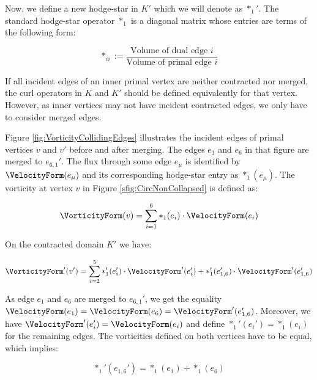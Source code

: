 Now, we define a new hodge-star in $K'$ which we will denote as $*_1'$.
The standard hodge-star operator $*_1$ is a diagonal matrix whose entries are terms of the following form:

\begin{equation}
*_{ii} := \frac{\text{Volume of dual edge $i$}}{\text{Volume of primal edge $i$}}
\end{equation}

If all incident edges of an inner primal vertex are neither contracted nor
merged, the curl operators in $K$ and $K'$ should be defined equivalently for that vertex.
However, as inner vertices may not have incident contracted edges, we only have to consider merged edges.


Figure \ref{fig:VorticityCollidingEdges} illustrates the incident edges of primal vertices $v$ and $v'$ before and after merging.%
The edges $e_1$ and $e_6$ in that figure are merged to $e_{6,1}'$.
The flux through some edge $e_\mu$ is identified by $\VelocityForm(e_\mu)$ and its corresponding hodge-star entry as $*_1(e_\mu)$.
The vorticity at vertex $v$ in Figure \ref{sfig:CircNonCollapsed} is defined as:

\begin{equation}
\VorticityForm(v) = \sum_{i=1}^6 *_1(e_i) \cdot \VelocityForm(e_i)
\end{equation}

On the contracted domain $K'$ we have:

\begin{equation}
\VorticityForm'(v') = \sum_{i=2}^5 *_1'(e_i') \cdot \VelocityForm'(e_i') + *_1'(e_{1,6}') \cdot \VelocityForm'(e_{1,6}')
\end{equation}

As edge $e_1$ and $e_6$ are merged to $e_{6,1}'$, we get the equality $\VelocityForm(e_1) = \VelocityForm(e_6) = \VelocityForm'(e_{1,6}')$.
Moreover, we have $\VelocityForm'(e_i') = \VelocityForm(e_i)$ and define $*_1'(e_i') = *_1(e_i)$ for the remaining edges.%
The vorticities defined on both vertices have to be equal, which implies:

\begin{equation}
\label{eq:SimpleHodgeEntryDef}
*_1'(e_{1,6}') = *_1(e_1) + *_1(e_6)
\end{equation}

